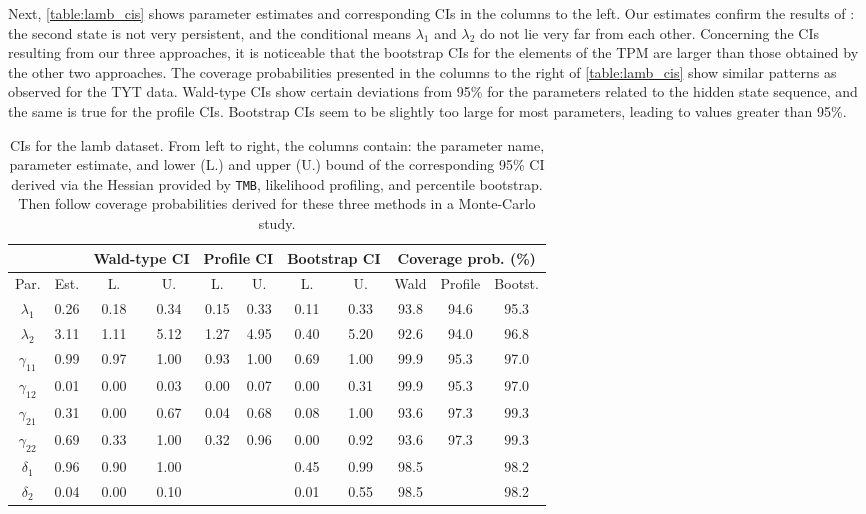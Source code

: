 \documentclass[bimj,fleqn]{w-art}\usepackage[]{graphicx}\usepackage[]{color}
\theoremstyle{plain}
\theoremstyle{definition}
\begin{document}
Next, \autoref{table:lamb_cis} shows parameter estimates and corresponding CIs in the columns to the left. Our estimates confirm the results of \cite{leroux}: the second state is not very persistent, and the conditional means $\lambda_1$ and $\lambda_2$ do not lie very far from each other. Concerning the CIs resulting from our three approaches, it is noticeable that the bootstrap CIs for the elements of the TPM are larger than those obtained by the other two approaches. The coverage probabilities presented in the columns to the right of \autoref{table:lamb_cis} show similar patterns as observed for the TYT data. Wald-type CIs show certain deviations from 95\% for the parameters related to the hidden state sequence, and the same is true for the profile CIs. Bootstrap CIs seem to be slightly too large for most parameters, leading to values greater than 95\%.

\begin{table}[ht]
\centering
\begin{tabular}{ccccccccccc}
  && \multicolumn{2}{c}{Wald-type CI}& \multicolumn{2}{c}{Profile CI}& \multicolumn{2}{c}{Bootstrap CI}& \multicolumn{3}{c}{Coverage prob. (\%)}\\ \hline
Par. & Est. & L. & U. & L. & U. & L. & U. & Wald & Profile & Bootst. \\ 
  \hline
$\lambda_{1}$ & 0.26 & 0.18 & 0.34 & 0.15 & 0.33 & 0.11 & 0.33 & 93.8 & 94.6 & 95.3 \\ 
  $\lambda_{2}$ & 3.11 & 1.11 & 5.12 & 1.27 & 4.95 & 0.40 & 5.20 & 92.6 & 94.0 & 96.8 \\ 
  $\gamma_{11}$ & 0.99 & 0.97 & 1.00 & 0.93 & 1.00 & 0.69 & 1.00 & 99.9 & 95.3 & 97.0 \\ 
  $\gamma_{12}$ & 0.01 & 0.00 & 0.03 & 0.00 & 0.07 & 0.00 & 0.31 & 99.9 & 95.3 & 97.0 \\ 
  $\gamma_{21}$ & 0.31 & 0.00 & 0.67 & 0.04 & 0.68 & 0.08 & 1.00 & 93.6 & 97.3 & 99.3 \\ 
  $\gamma_{22}$ & 0.69 & 0.33 & 1.00 & 0.32 & 0.96 & 0.00 & 0.92 & 93.6 & 97.3 & 99.3 \\ 
  $\delta_{1}$ & 0.96 & 0.90 & 1.00 &  &  & 0.45 & 0.99 & 98.5 &  & 98.2 \\ 
  $\delta_{2}$ & 0.04 & 0.00 & 0.10 &  &  & 0.01 & 0.55 & 98.5 &  & 98.2 \\ 
   \hline
\end{tabular}
\caption{CIs for the lamb dataset. From left to right, the columns contain: the parameter name, parameter estimate, and lower (L.) and upper (U.) bound of the corresponding 95\% CI derived via the Hessian provided by {\tt TMB}, likelihood profiling, and percentile bootstrap. Then follow coverage probabilities derived for these three methods in a Monte-Carlo study.} 
\label{table:lamb_cis}
\end{table}
\end{document}
